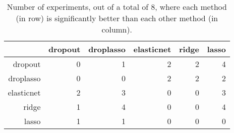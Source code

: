 \begin{table}[ht]
\centering
\begin{tabular}{rrrrrr}
  \hline
 & dropout & droplasso & elasticnet & ridge & lasso \\ 
  \hline
dropout &   0 &   1 &   2 &   2 &   4 \\ 
  droplasso &   0 &   0 &   2 &   2 &   2 \\ 
  elasticnet &   2 &   3 &   0 &   0 &   3 \\ 
  ridge &   1 &   4 &   0 &   0 &   4 \\ 
  lasso &   1 &   1 &   0 &   0 &   0 \\ 
   \hline
\end{tabular}
\caption{Number of experiments, out of a total of 8, where each method (in row) is significantly better than each other method (in column).} 
\end{table}
